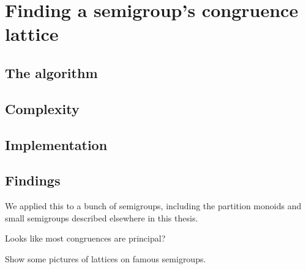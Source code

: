 \chapter{Finding a semigroup's congruence lattice}
\label{chap:lattice}

\lipsum[3]

\section{The algorithm}

\section{Complexity}

\section{Implementation}

\section{Findings}
We applied this to a bunch of semigroups, including the partition monoids and
small semigroups described elsewhere in this thesis.

Looks like most congruences are principal?

Show some pictures of lattices on famous semigroups.
